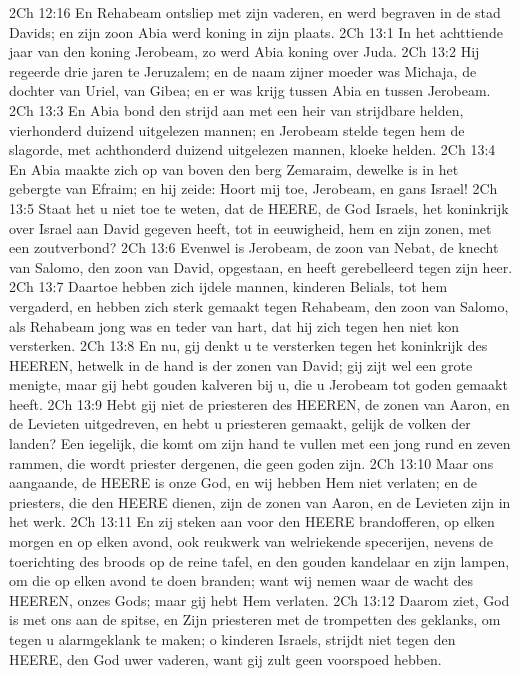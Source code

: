2Ch 12:16  En Rehabeam ontsliep met zijn vaderen, en werd begraven in de stad Davids; en zijn zoon Abia werd koning in zijn plaats.
2Ch 13:1  In het achttiende jaar van den koning Jerobeam, zo werd Abia koning over Juda.
2Ch 13:2  Hij regeerde drie jaren te Jeruzalem; en de naam zijner moeder was Michaja, de dochter van Uriel, van Gibea; en er was krijg tussen Abia en tussen Jerobeam.
2Ch 13:3  En Abia bond den strijd aan met een heir van strijdbare helden, vierhonderd duizend uitgelezen mannen; en Jerobeam stelde tegen hem de slagorde, met achthonderd duizend uitgelezen mannen, kloeke helden.
2Ch 13:4  En Abia maakte zich op van boven den berg Zemaraim, dewelke is in het gebergte van Efraim; en hij zeide: Hoort mij toe, Jerobeam, en gans Israel!
2Ch 13:5  Staat het u niet toe te weten, dat de HEERE, de God Israels, het koninkrijk over Israel aan David gegeven heeft, tot in eeuwigheid, hem en zijn zonen, met een zoutverbond?
2Ch 13:6  Evenwel is Jerobeam, de zoon van Nebat, de knecht van Salomo, den zoon van David, opgestaan, en heeft gerebelleerd tegen zijn heer.
2Ch 13:7  Daartoe hebben zich ijdele mannen, kinderen Belials, tot hem vergaderd, en hebben zich sterk gemaakt tegen Rehabeam, den zoon van Salomo, als Rehabeam jong was en teder van hart, dat hij zich tegen hen niet kon versterken.
2Ch 13:8  En nu, gij denkt u te versterken tegen het koninkrijk des HEEREN, hetwelk in de hand is der zonen van David; gij zijt wel een grote menigte, maar gij hebt gouden kalveren bij u, die u Jerobeam tot goden gemaakt heeft.
2Ch 13:9  Hebt gij niet de priesteren des HEEREN, de zonen van Aaron, en de Levieten uitgedreven, en hebt u priesteren gemaakt, gelijk de volken der landen? Een iegelijk, die komt om zijn hand te vullen met een jong rund en zeven rammen, die wordt priester dergenen, die geen goden zijn.
2Ch 13:10  Maar ons aangaande, de HEERE is onze God, en wij hebben Hem niet verlaten; en de priesters, die den HEERE dienen, zijn de zonen van Aaron, en de Levieten zijn in het werk.
2Ch 13:11  En zij steken aan voor den HEERE brandofferen, op elken morgen en op elken avond, ook reukwerk van welriekende specerijen, nevens de toerichting des broods op de reine tafel, en den gouden kandelaar en zijn lampen, om die op elken avond te doen branden; want wij nemen waar de wacht des HEEREN, onzes Gods; maar gij hebt Hem verlaten.
2Ch 13:12  Daarom ziet, God is met ons aan de spitse, en Zijn priesteren met de trompetten des geklanks, om tegen u alarmgeklank te maken; o kinderen Israels, strijdt niet tegen den HEERE, den God uwer vaderen, want gij zult geen voorspoed hebben.
